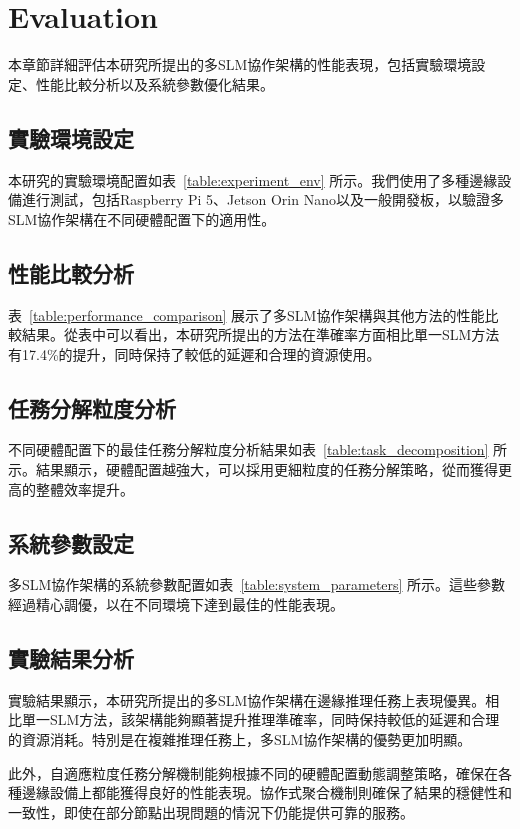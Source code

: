 \chapter{Evaluation}

本章節詳細評估本研究所提出的多SLM協作架構的性能表現，包括實驗環境設定、性能比較分析以及系統參數優化結果。

\section{實驗環境設定}

本研究的實驗環境配置如表~\ref{table:experiment_env} 所示。我們使用了多種邊緣設備進行測試，包括Raspberry Pi 5、Jetson Orin Nano以及一般開發板，以驗證多SLM協作架構在不同硬體配置下的適用性。





\section{性能比較分析}

表~\ref{table:performance_comparison} 展示了多SLM協作架構與其他方法的性能比較結果。從表中可以看出，本研究所提出的方法在準確率方面相比單一SLM方法有17.4\%的提升，同時保持了較低的延遲和合理的資源使用。



\section{任務分解粒度分析}

不同硬體配置下的最佳任務分解粒度分析結果如表~\ref{table:task_decomposition} 所示。結果顯示，硬體配置越強大，可以採用更細粒度的任務分解策略，從而獲得更高的整體效率提升。



\section{系統參數設定}

多SLM協作架構的系統參數配置如表~\ref{table:system_parameters} 所示。這些參數經過精心調優，以在不同環境下達到最佳的性能表現。



\section{實驗結果分析}

實驗結果顯示，本研究所提出的多SLM協作架構在邊緣推理任務上表現優異。相比單一SLM方法，該架構能夠顯著提升推理準確率，同時保持較低的延遲和合理的資源消耗。特別是在複雜推理任務上，多SLM協作架構的優勢更加明顯。

此外，自適應粒度任務分解機制能夠根據不同的硬體配置動態調整策略，確保在各種邊緣設備上都能獲得良好的性能表現。協作式聚合機制則確保了結果的穩健性和一致性，即使在部分節點出現問題的情況下仍能提供可靠的服務。 